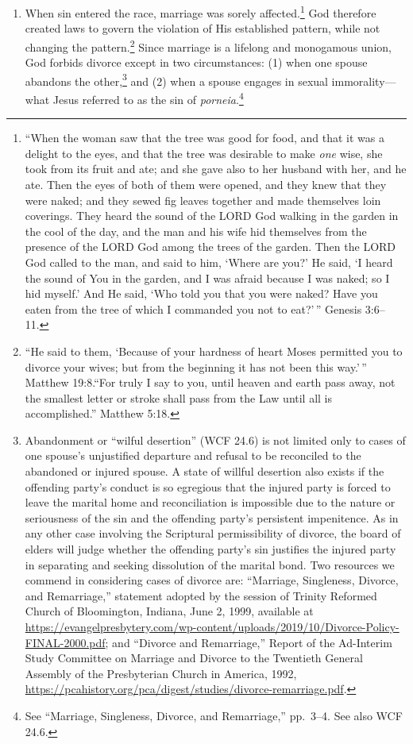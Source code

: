 \documentclass[
]{book}
\providecommand{\tightlist}{%
  \setlength{\itemsep}{0pt}\setlength{\parskip}{0pt}}
\begin{document}
\begin{enumerate}
\def\labelenumi{\arabic{enumi}.}
\setcounter{enumi}{18}
\tightlist
\item
  When sin entered the race, marriage was sorely affected.\footnote{``When the woman saw that the tree was good for food, and that it was a delight to the eyes, and that the tree was desirable to make \emph{one} wise, she took from its fruit and ate; and she gave also to her husband with her, and he ate. Then the eyes of both of them were opened, and they knew that they were naked; and they sewed fig leaves together and made themselves loin coverings. They heard the sound of the LORD God walking in the garden in the cool of the day, and the man and his wife hid themselves from the presence of the LORD God among the trees of the garden. Then the LORD God called to the man, and said to him, `Where are you?' He said, `I heard the sound of You in the garden, and I was afraid because I was naked; so I hid myself.' And He said, `Who told you that you were naked? Have you eaten from the tree of which I commanded you not to eat?'\,'' Genesis 3:6--11.} God therefore created laws to govern the violation of His established pattern, while not changing the pattern.\footnote{``He said to them, `Because of your hardness of heart Moses permitted you to divorce your wives; but from the beginning it has not been this way.'\,'' Matthew 19:8.``For truly I say to you, until heaven and earth pass away, not the smallest letter or stroke shall pass from the Law until all is accomplished.'' Matthew 5:18.} Since marriage is a lifelong and monogamous union, God forbids divorce except in two circumstances: (1) when one spouse abandons the other,\footnote{Abandonment or ``wilful desertion'' (WCF 24.6) is not limited only to cases of one spouse's unjustified departure and refusal to be reconciled to the abandoned or injured spouse. A state of willful desertion also exists if the offending party's conduct is so egregious that the injured party is forced to leave the marital home and reconciliation is impossible due to the nature or seriousness of the sin and the offending party's persistent impenitence. As in any other case involving the Scriptural permissibility of divorce, the board of elders will judge whether the offending party's sin justifies the injured party in separating and seeking dissolution of the marital bond. Two resources we commend in considering cases of divorce are: ``Marriage, Singleness, Divorce, and Remarriage,'' statement adopted by the session of Trinity Reformed Church of Bloomington, Indiana, June 2, 1999, available at \url{https://evangelpresbytery.com/wp-content/uploads/2019/10/Divorce-Policy-FINAL-2000.pdf}; and ``Divorce and Remarriage,'' Report of the Ad-Interim Study Committee on Marriage and Divorce to the Twentieth General Assembly of the Presbyterian Church in America, 1992, \url{https://pcahistory.org/pca/digest/studies/divorce-remarriage.pdf}.} and (2) when a spouse engages in sexual immorality---what Jesus referred to as the sin of \emph{porneia}.\footnote{See ``Marriage, Singleness, Divorce, and Remarriage,'' pp.~3--4. See also WCF 24.6.}
\end{enumerate}
\end{document}
